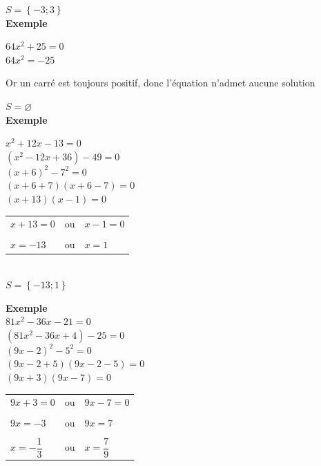 $ S = \left\lbrace -3 ; 3 \right\rbrace $ \\

\textbf{Exemple }

$ 64x^2 + 25 = 0 $\\

$64x^2 = -25 $ 

Or un carré est toujours positif, donc l'équation n'admet aucune solution


$ S = \varnothing $ \\

\textbf{Exemple }

$ x^2 + 12x - 13 = 0 $\\

$ \left(x^2 - 12x + 36 \right) -49 = 0 $\\

$ \left(x+6\right)^2 - 7^2 = 0 $\\

$\left(x+6+7\right)\left(x+6-7\right)=0 $\\

$ \left(x+13\right)\left(x-1\right) = 0 $ \\

\begin{tabular}{lcl}
$x + 13 = 0 $ &ou& $ x-1 = 0 $\\
&&\\
$ x = -13 $ &ou &$ x=1 $ \\
\end{tabular}\\

$ S = \left\lbrace -13 ; 1 \right\rbrace $

\newpage

\textbf{Exemple }\\

$ 81x^2-36x-21 = 0 $\\

$ \left(81x^2 - 36x + 4\right) - 25 = 0 $\\

$ \left(9x-2\right)^2 - 5^2 = 0 $\\

$ \left(9x-2+5\right)\left(9x-2-5\right)  = 0 $\\

$ \left(9x + 3\right)\left(9x - 7 \right) = 0 $ \\

\begin{tabular}{lcl}
$ 9x + 3 = 0 $ &ou& $ 9x - 7 = 0 $\\
&&\\
$ 9x = -3 $ &ou& $ 9x = 7 $ \\
&&\\
$ x = -\dfrac{1}{3} $ & ou& $ x = \dfrac{7}{9} $ \\
\end{tabular}\\

